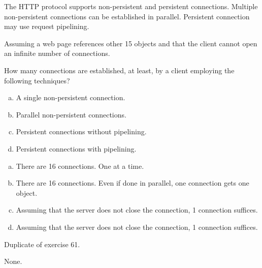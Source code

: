 \begin{Exercise}
The HTTP protocol supports non-persistent and persistent connections.
Multiple non-persistent connections can be established in parallel.
Persistent connection may use request pipelining.

Assuming a web page references other 15 objects and that the client cannot open an infinite number of connections.

How many connections are established, at least, by a client employing the following techniques?

\begin{enumerate}[a)]
\item A single non-persistent connection.
\item Parallel non-persistent connections.
\item Persistent connections without pipelining.
\item Persistent connections with pipelining.
\end{enumerate}
\end{Exercise}
\begin{Answer}
\begin{enumerate}[a)]
\item There are 16 connections. One at a time.
\item There are 16 connections. Even if done in parallel, one connection gets one object.
\item Assuming that the server does not close the connection, 1 connection suffices.
\item Assuming that the server does not close the connection, 1 connection suffices.
\end{enumerate}

\end{Answer}

\begin{Exercise}
Duplicate of exercise 61.
\end{Exercise}
\begin{Answer}
None.
\end{Answer}

\begin{Exercise}
\end{Exercise}

